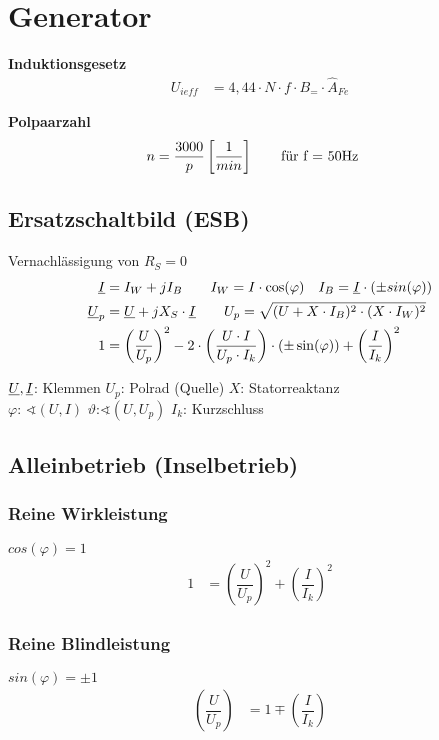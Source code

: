 \clearpage
\section{Generator}
\textbf{Induktionsgesetz}
\begin{align*}
    U_{ieff} &= 4,44 \cdot N \cdot f \cdot B_= \cdot \hat{A}_{Fe}
\end{align*}

\textbf{Polpaarzahl}
\begin{align*}
    n &= \dfrac{3000}{p} \left[ \frac{1}{min}\right] \qquad \textnormal{für f = 50Hz}
    \end{align*}

\subsection{Ersatzschaltbild (ESB)}
Vernachlässigung von $R_S = 0$
\begin{align*}
    \underline{I} &= I_W +jI_B \qquad I_W = I \cdot \cos(\varphi) \quad I_B = \underline{I}\cdot (\pm sin(\varphi))\\
    \underline{U}_p &= \underline{U} +jX_S \cdot \underline{I} \qquad
    U_p = \sqrt{(U+X\cdot I_B)^2 \cdot (X\cdot I_W)^2}\\
    1 &= \left( \dfrac{U}{U_p} \right)^2 - 2 \cdot \left( \dfrac{U \cdot I}{U_p \cdot I_k}\right) \cdot (\pm \sin(\varphi)) + \left(\dfrac{I}{I_k}\right)^2
\end{align*}

$\underline{U}, \underline{I}$: Klemmen \quad $U_p$: Polrad (Quelle) \quad $X$: Statorreaktanz \\
$\varphi$: $\sphericalangle (U, I)$ \qquad $\vartheta$:$\sphericalangle (U, U_p)$ \qquad $I_k$: Kurzschluss

\subsection{Alleinbetrieb (Inselbetrieb)}
\subsubsection{Reine Wirkleistung}
$cos(\varphi) = 1$
\begin{align*}
    1 &= \left( \dfrac{U}{U_p} \right)^2 + \left(\dfrac{I}{I_k}\right)^2
\end{align*}

\subsubsection{Reine Blindleistung}
$    sin(\varphi) = \pm1$
\begin{align*}
    \left( \dfrac{U}{U_p} \right) &= 1 \mp \left(\dfrac{I}{I_k}\right)
\end{align*}


